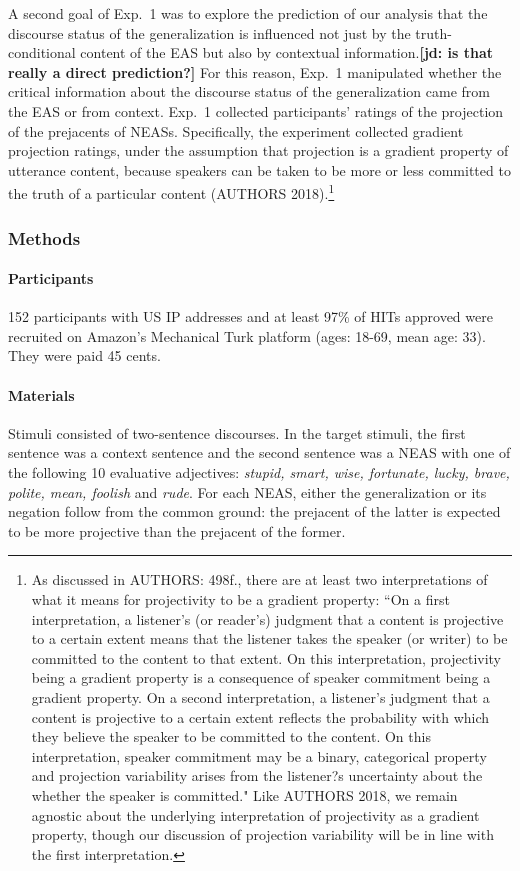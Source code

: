 \documentclass[11pt,fleqn]{article}
\newcommand{\6}{\mbox{$[\hspace*{-.6mm}[$}}
\newcommand{\9}{\mbox{$]\hspace*{-.6mm}]$}}
\newcommand{\jd}[1]{\textbf{\color{red}[jd: #1]}}
\begin{document}
A second goal of Exp.~1 was to explore the prediction of our analysis that the discourse status of the generalization is influenced not just by the truth-conditional content of the EAS but also by contextual information.\jd{is that really a direct prediction?} For this reason, Exp.~1 manipulated whether the critical information about the discourse status of the generalization came from the EAS or from context. Exp.~1 collected participants' ratings of the projection of the prejacents of NEASs. Specifically, the experiment collected gradient projection ratings, under the assumption that projection is a gradient property of utterance content, because speakers can be taken to be more or less committed to the truth of a particular content (AUTHORS 2018).\footnote{As discussed in AUTHORS: 498f., there are at least two interpretations of what it means for projectivity to be a gradient property: ``On a first interpretation, a listener's (or reader's) judgment that a content is projective to a certain extent means that the listener takes the speaker (or writer) to be committed to the content to that extent. On this interpretation, projectivity being a gradient property is a consequence of speaker commitment being a gradient property. On a second interpretation, a listener's judgment that a content is projective to a certain extent reflects the probability with which they believe the speaker to be committed to the content. On this interpretation, speaker commitment may be a binary, categorical property and projection variability arises from the listener?s uncertainty about the whether the speaker is committed." Like AUTHORS 2018, we remain agnostic about the underlying interpretation of projectivity as a gradient property, though our discussion of projection variability will be in line with the first interpretation.}

\subsubsection{Methods}

\paragraph{Participants} 152 participants with US IP addresses and at least 97\% of HITs approved were recruited on Amazon's Mechanical Turk platform (ages: 18-69, mean age: 33). They were paid 45 cents.

\paragraph{Materials} Stimuli consisted of two-sentence discourses. In the target stimuli, the first sentence was a context sentence and the second sentence was a NEAS with one of the following 10 evaluative adjectives: {\em stupid, smart, wise, fortunate, lucky, brave, polite, mean, foolish} and {\em rude}. For each NEAS, either the generalization or its negation follow from the common ground: the prejacent of the latter is expected to be more projective than the prejacent of the former.
\end{document}

